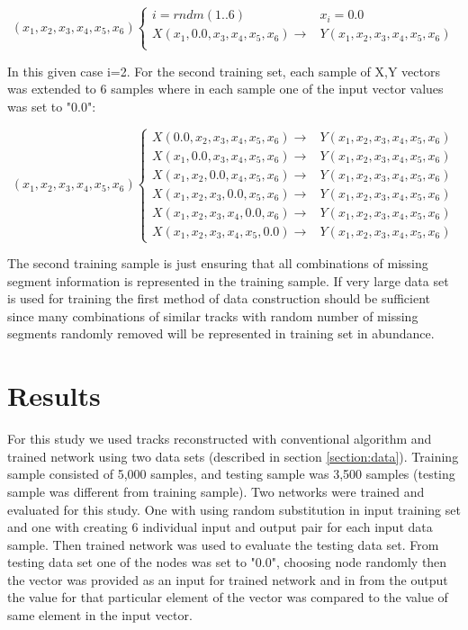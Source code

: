 \documentclass[12pt]{article}
\begin{document}
\begin{equation}
  (x_1,x_2,x_3,x_4,x_5,x_6) \begin{cases}
    i = rndm(1..6)  & x_i = 0.0  \\
    X (x_1,0.0,x_3,x_4,x_5,x_6)   \text{$\rightarrow$}  & Y (x_1,x_2,x_3,x_4,x_5,x_6) \\
     \end{cases}
\end{equation}

In this given case i=2. For the second training set, each sample of X,Y vectors
was extended to 6 samples where in each sample one of the input vector values 
was set to "0.0":

\begin{equation}
  (x_1,x_2,x_3,x_4,x_5,x_6) \begin{cases}
   X (0.0,x_2,x_3,x_4,x_5,x_6)  \text{$\rightarrow$}  & Y (x_1,x_2,x_3,x_4,x_5,x_6)  \\
   X (x_1,0.0,x_3,x_4,x_5,x_6)   \text{$\rightarrow$}  & Y (x_1,x_2,x_3,x_4,x_5,x_6) \\
   X (x_1,x_2,0.0,x_4,x_5,x_6)  \text{$\rightarrow$}  &  Y (x_1,x_2,x_3,x_4,x_5,x_6) \\
   X (x_1,x_2,x_3,0.0,x_5,x_6)  \text{$\rightarrow$}  & Y (x_1,x_2,x_3,x_4,x_5,x_6) \\
   X (x_1,x_2,x_3,x_4,0.0,x_6)  \text{$\rightarrow$}  & Y (x_1,x_2,x_3,x_4,x_5,x_6) \\
   X (x_1,x_2,x_3,x_4,x_5,0.0)  \text{$\rightarrow$}  & Y (x_1,x_2,x_3,x_4,x_5,x_6)
  \end{cases}
\end{equation}

The second training sample is just ensuring that all combinations of missing segment information
is represented in the training sample. If very large data set is used for training the first method of data
construction should be sufficient since many combinations of similar tracks with random number of missing
segments randomly removed will be represented in training set in abundance.


\section{Results}

\indent

For this study we used tracks reconstructed with conventional algorithm and trained network using two data sets
(described in section \ref{section:data}). Training sample consisted of 5,000 samples, and testing sample was 3,500 samples
(testing sample was different from training sample). Two networks were trained and evaluated for this study. One with using random substitution in input training set and one with creating 6 individual input and output pair for each input data sample.
Then trained network was used to evaluate the testing data set. From testing data set one of the nodes was set to "0.0", choosing node randomly then the vector was provided as an input for trained network and in from the output the value for that particular element of the vector was compared to the value of same element in the input vector.
\end{document}
